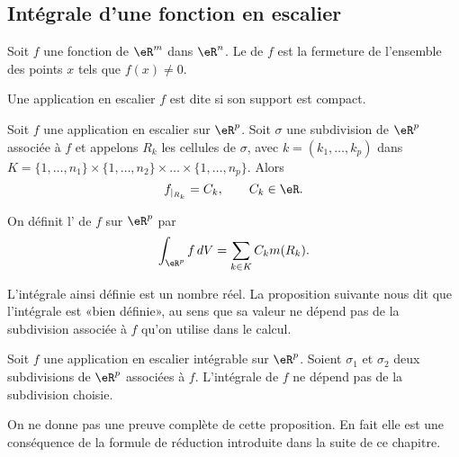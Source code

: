 \subsection{Intégrale d'une fonction en escalier}

\begin{definition}
	Soit \( f\) une fonction de \( \eR^m\) dans \( \eR^n\). Le  de \( f\) est la fermeture de l'ensemble des points \( x\) tels que \( f(x)\neq 0\).
\end{definition}
\begin{definition}
	Une application en escalier \( f\) est dite  si son support est compact.
\end{definition}
Soit \( f\) une application en escalier sur \( \eR^p\). Soit \( \sigma\) une subdivision de  \( \eR^p\) associée à \( f\) et appelons \( R_k\) les cellules de \( \sigma\), avec \( k=(k_1,\ldots,k_p)\) dans \(  K=\{1,\ldots,n_1\}\times\{1,\ldots,n_2\}\times\ldots \times\{1,\ldots,n_p\}\). Alors
\[
	f_{\vert_{R_k}}=C_k, \qquad C_k\in\eR.
\]

\begin{definition}
	On définit l' de \( f\) sur \( \eR^p\) par
	\[
		\int_{\eR^p}f\,dV=\sum_{k\in K}C_km(R_k).
	\]
\end{definition}
L'intégrale ainsi définie est un nombre réel. La proposition suivante nous dit que l'intégrale est «bien définie», au sens que sa valeur ne dépend pas de la subdivision associée à \( f\) qu'on utilise dans le calcul.
\begin{proposition}
	Soit \( f\) une application en escalier intégrable sur \( \eR^p\). Soient \( \sigma_1\) et \( \sigma_2\) deux subdivisions de \( \eR^p\) associées à  \( f\). L'intégrale de \( f\) ne dépend pas de la subdivision choisie.
\end{proposition}
On ne donne pas une preuve complète de cette proposition. En fait elle est une conséquence de la formule de réduction introduite dans la suite de ce chapitre.


